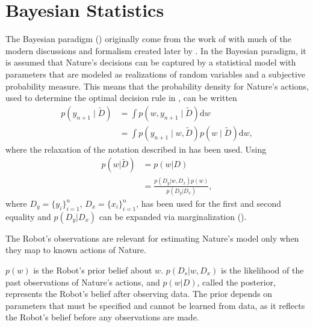 \section{Bayesian Statistics}
The Bayesian paradigm () originally come from the work of \citet{Bayes:63,laplace_thorie_1812} with much of the modern discussions and formalism created later by \citet{Finetti1937LaP,Jeffreys1940,Savage1954}.\newline
In the Bayesian paradigm, it is assumed that Nature's decisions can be captured by a statistical model with parameters that are modeled as realizations of random variables and a subjective probability measure. This means that the probability density for Nature's actions, used to determine the optimal decision rule in , can be written
\begin{equation}
	\begin{split}
		p(y_{n+1}\mid \tilde{D}) &= \int p(w,y_{n+1}\mid \tilde{D}) \mathrm{d}w\\
		& = \int p(y_{n+1}\mid w,\tilde{D})p(w\mid \tilde{D}) \mathrm{d}w,
	\end{split}
	\label{eq:hest1}
\end{equation}
where the relaxation of the notation described in  has been used. Using 
\begin{equation}
	\begin{split}
		p(w|\tilde{D}) &= p(w|D)\\
		&= \frac{p(D_y|w,D_x)p(w)}{p(D_y|D_x)},
	\end{split}
	\label{eq:pa2}
\end{equation}
where $D_y= \{y_i\}_{i=1}^n$, $D_x = \{x_i\}_{i=1}^n$,  has been used for the first and second equality and $p(D_y|D_x)$ can be expanded via marginalization ().

\begin{axiom}
	\label{ax:observation_relevance}
	The Robot's observations are relevant for estimating Nature's model only when they map to known actions of Nature.
\end{axiom}

$p(w)$ is the Robot's prior belief about $w$. $p(D_s|w,D_x)$ is the likelihood of the past observations of Nature's actions, and $p(w|D)$, called the posterior, represents the Robot's belief after observing data. The prior depends on parameters that must be specified and cannot be learned from data, as it reflects the Robot's belief before any observations are made.

